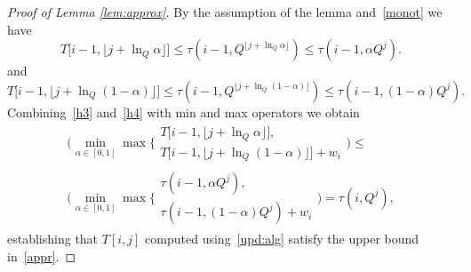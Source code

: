 \documentclass[11pt]{article}
\begin{document}
\begin{proof}[Proof of Lemma \ref{lem:approx}]
By the assumption of the lemma and~\eqref{monot} we have
\begin{equation}\label{h3}
T\big[i-1,\lfloor j + \ln_{Q}\alpha\rfloor\big]\leq\tau(i-1,Q^{\lfloor j + \ln_{Q}\alpha\rfloor})
\leq\tau(i-1,\alpha Q^{j}).
\end{equation}
and
\begin{equation}\label{h4}
T\big[i-1,\lfloor j + \ln_{Q} (1-\alpha)\rfloor\big]\leq\tau(i-1,Q^{\lfloor j + \ln_{Q}(1-\alpha)\rfloor})
\leq\tau(i-1,(1-\alpha) Q^{j}).
\end{equation}
Combining~\eqref{h3} and~\eqref{h4} with min and max operators we obtain
\begin{equation*}
\begin{split}
\Bigg(\min_{\alpha\in [0,1]} \max\Bigg\{\begin{array}{l}
  T\big[i-1,\lfloor j + \ln_{Q}\alpha\rfloor\big],\\
  T\big[i-1,\lfloor j + \ln_{Q}(1-\alpha)\rfloor\big] + w_i
\end{array}\Bigg) \leq \\
\Bigg(\min_{\alpha\in [0,1]} \max\Bigg\{\begin{array}{l}
  \tau(i-1,\alpha Q^{j}),\\
  \tau(i-1,(1-\alpha) Q^{j}) + w_i
\end{array}\Bigg) = \tau(i,Q^{j}),
\end{split}
\end{equation*}
establishing that $T[i,j]$ computed using~\eqref{upd:alg} satisfy the upper bound in~\eqref{appr}.
\end{proof}











\end{document}
